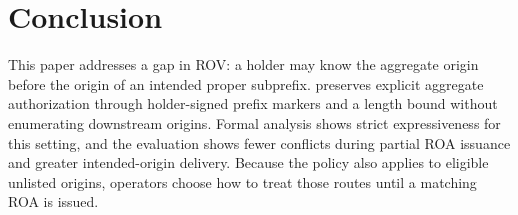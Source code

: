 \section{Conclusion}
\label{sec:conclusion}

This paper addresses a gap in ROV: a holder may know the aggregate origin before the origin of an intended proper subprefix. \ssrov{} preserves explicit aggregate authorization through holder-signed prefix markers and a length bound without enumerating downstream origins. Formal analysis shows strict expressiveness for this setting, and the evaluation shows fewer conflicts during partial ROA issuance and greater intended-origin delivery. Because the policy also applies to eligible unlisted origins, operators choose how to treat those routes until a matching ROA is issued.
